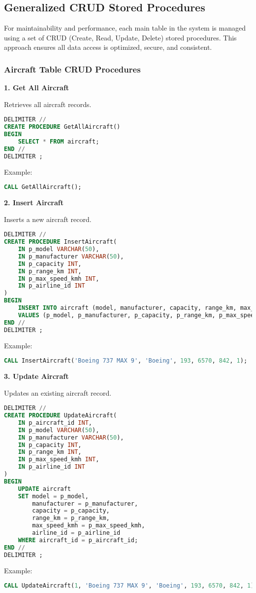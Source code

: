 \documentclass[a4paper,12pt]{article}
\begin{document}
\subsection{Generalized CRUD Stored Procedures}
For maintainability and performance, each main table in the system is managed using a set of CRUD (Create, Read, Update, Delete) stored procedures. This approach ensures all data access is optimized, secure, and consistent.

\subsubsection{Aircraft Table CRUD Procedures}
\textbf{1. Get All Aircraft}

Retrieves all aircraft records.
\begin{lstlisting}[language=SQL, caption=GetAllAircraft Stored Procedure]
DELIMITER //
CREATE PROCEDURE GetAllAircraft()
BEGIN
    SELECT * FROM aircraft;
END //
DELIMITER ;
\end{lstlisting}
Example:
\begin{lstlisting}[language=SQL]
CALL GetAllAircraft();
\end{lstlisting}

\textbf{2. Insert Aircraft}

Inserts a new aircraft record.
\begin{lstlisting}[language=SQL, caption=InsertAircraft Stored Procedure]
DELIMITER //
CREATE PROCEDURE InsertAircraft(
    IN p_model VARCHAR(50),
    IN p_manufacturer VARCHAR(50),
    IN p_capacity INT,
    IN p_range_km INT,
    IN p_max_speed_kmh INT,
    IN p_airline_id INT
)
BEGIN
    INSERT INTO aircraft (model, manufacturer, capacity, range_km, max_speed_kmh, airline_id)
    VALUES (p_model, p_manufacturer, p_capacity, p_range_km, p_max_speed_kmh, p_airline_id);
END //
DELIMITER ;
\end{lstlisting}
Example:
\begin{lstlisting}[language=SQL]
CALL InsertAircraft('Boeing 737 MAX 9', 'Boeing', 193, 6570, 842, 1);
\end{lstlisting}

\textbf{3. Update Aircraft}

Updates an existing aircraft record.
\begin{lstlisting}[language=SQL, caption=UpdateAircraft Stored Procedure]
DELIMITER //
CREATE PROCEDURE UpdateAircraft(
    IN p_aircraft_id INT,
    IN p_model VARCHAR(50),
    IN p_manufacturer VARCHAR(50),
    IN p_capacity INT,
    IN p_range_km INT,
    IN p_max_speed_kmh INT,
    IN p_airline_id INT
)
BEGIN
    UPDATE aircraft
    SET model = p_model,
        manufacturer = p_manufacturer,
        capacity = p_capacity,
        range_km = p_range_km,
        max_speed_kmh = p_max_speed_kmh,
        airline_id = p_airline_id
    WHERE aircraft_id = p_aircraft_id;
END //
DELIMITER ;
\end{lstlisting}
Example:
\begin{lstlisting}[language=SQL]
CALL UpdateAircraft(1, 'Boeing 737 MAX 9', 'Boeing', 193, 6570, 842, 1);
\end{lstlisting}
\end{document}
